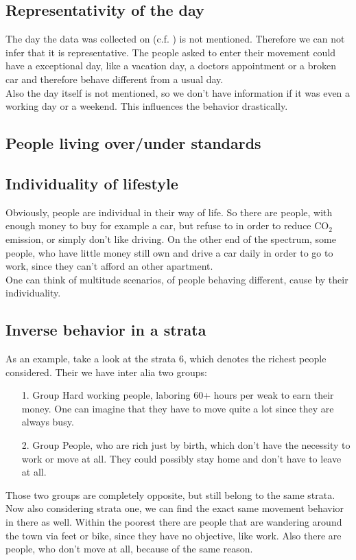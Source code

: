 \documentclass[runningheads]{llncs}
\begin{document}
	\subsection{Representativity of the day}
	The day the data was collected on (c.f. ) is not mentioned. Therefore we can not infer that it is representative. The people asked to enter their movement could have a exceptional day, like a vacation day, a doctors appointment or a broken car and therefore behave different from a usual day. \\
	Also the day itself is not mentioned, so we don't have information if it was even a working day or a weekend. This influences the behavior drastically.
	
	\subsection{People living over/under standards}
	
	\subsection{Individuality of lifestyle}
	Obviously, people are individual in their way of life. So there are people, with enough money to buy for example a car, but refuse to in order to reduce CO$_2$ emission, or simply don't like driving. On the other end of the spectrum, some people, who have little money still own and drive a car daily in order to go to work, since they can't afford an other apartment.\\
	One can think of multitude scenarios, of people behaving different, cause by their individuality.
	
	\subsection{Inverse behavior in a strata}
	As an example, take a look at the strata 6, which denotes the richest people considered. Their we have inter alia two groups: 
	\begin{enumerate}
		\setlength{\itemindent}{1cm}
		\item[1. Group]
		Hard working people, laboring 60+ hours per weak to earn their money. One can imagine that they have to move quite a lot since they are always busy.
		\item[2. Group]
		People, who are rich just by birth, which don't have the necessity to work or move at all. They could possibly stay home and don't have to leave at all.
	\end{enumerate} 
	Those two groups are completely opposite, but still belong to the same strata. Now also considering strata one, we can find the exact same movement behavior in there as well. Within the poorest there are people that are wandering around the town via feet or bike, since they have no objective, like work. Also there are people, who don't move at all, because of the same reason.	
	
\end{document}
